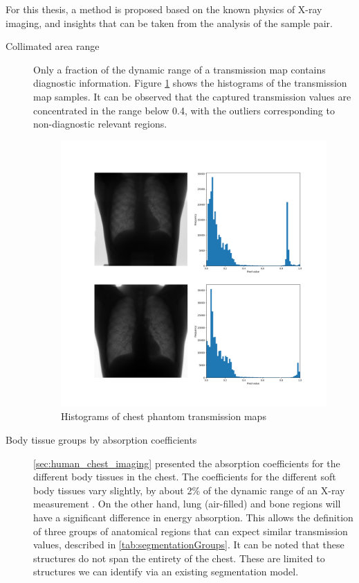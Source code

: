 \documentclass[nomenclature, english, bibtex]{kththesis}
\numberwithin{listing}{chapter}
\begin{document}
For this thesis, a method is proposed based on the known physics of X-ray imaging, and insights that can be
taken from the analysis of the sample pair.
\begin{description}
    \item[Collimated area range] Only a fraction of the dynamic range of a transmission map
   contains diagnostic information. Figure \ref{fig:transmissionMapsHistograms} shows the histograms
   of the transmission map samples. It can be observed that the captured transmission values are concentrated in
  the range below 0.4, with the outliers corresponding to non-diagnostic relevant regions.
  \begin{figure}[H]
        \centering
        \includegraphics[width=1.0\textwidth]{figures/transmission_maps_histograms.png}
        \caption{Histograms of chest phantom transmission maps}
        \label{fig:transmissionMapsHistograms}
    \end{figure}

    \item[Body tissue groups by absorption coefficients] \autoref{sec:human_chest_imaging} presented the absorption coefficients
    for the different body tissues in the chest. The coefficients for the different soft body tissues
    vary slightly, by about 2\% of the dynamic range of an X-ray measurement \cite[p.~54]{epstein2008}. On the other hand,
    lung (air-filled) and bone regions will have a significant difference in energy absorption. This allows the
    definition of three groups of anatomical regions that can expect similar transmission values, described in
    \autoref{tab:segmentationGroups}. It can be noted that these structures do not span the entirety of the
   chest. These are limited to structures we can identify via an existing segmentation model.


\end{description}
\end{document}
